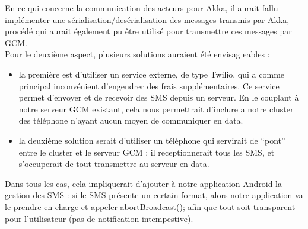 \documentclass[a4paper,12pt]{article}
\begin{document}
En ce qui concerne la communication des acteurs pour Akka, il aurait fallu
implémenter une sérialisation/desérialisation des messages transmis par Akka,
procédé qui aurait également pu être utilisé pour transmettre ces messages par
GCM.\\
Pour le deuxième aspect, plusieurs solutions auraient été envisag
eables :\\
\begin{itemize}
\item la première est d’utiliser un service externe, de type Twilio, qui a
  comme principal inconvénient d’engendrer des frais supplémentaires. Ce
  service permet d’envoyer et de recevoir des SMS depuis un serveur. En le
  couplant à notre serveur GCM existant, cela nous permettrait d’inclure a
  notre cluster des téléphone n’ayant aucun moyen de communiquer en data.\\
\item la deuxième solution serait d’utiliser un téléphone qui servirait de
  “pont” entre le cluster et le serveur GCM : il receptionnerait tous les SMS,
  et s’occuperait de tout transmettre au serveur en data.
\end{itemize}

Dans tous les cas, cela impliquerait d’ajouter à notre application Android la
gestion des SMS : si le SMS présente un certain format, alors notre application
va le prendre en charge et appeler abortBroadcast(); afin que tout soit
transparent pour l’utilisateur (pas de notification intempestive).
\end{document}
